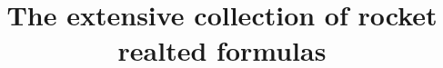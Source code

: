 \documentclass{paper}
\begin{document}
\title{The extensive collection of rocket realted formulas}
\maketitle
\tableofcontents
\newpage
\end{document}
